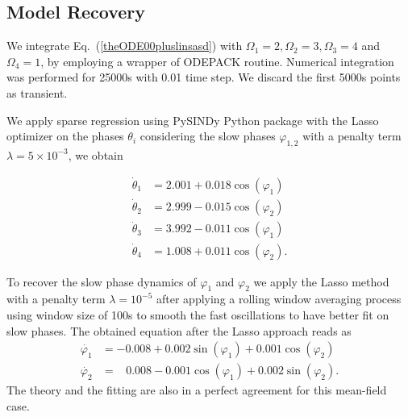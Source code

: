 \documentclass[12pt]{article}
\theoremstyle{plain}
\theoremstyle{definition}
\theoremstyle{remark}
\theoremstyle{remark}
\begin{document}
{\subsection{Model Recovery}
We integrate Eq.~(\ref{theODE00pluslinsasd}) with  $\Omega_1 = 2, \Omega_2 = 3, \Omega_3 = 4$ and $\Omega_4 = 1$, by employing a wrapper of ODEPACK routine. Numerical integration was performed for 25000s with 0.01 time step. We discard the first 5000s points as transient. 


We apply sparse regression using PySINDy Python package \cite{kaptanoglu2022} with the Lasso optimizer on the phases $\theta_i$ considering the slow phases $\varphi_{1,2}$ with a penalty term $\lambda = 5\times10^{-3}$, we obtain

\begin{align}
\dot{\theta}_1 &=2.001 + 0.018 \cos(\varphi_1) \\
\dot{\theta}_2 &=2.999 - 0.015 \cos(\varphi_2) \\
\dot{\theta}_3 &=3.992 - 0.011 \cos(\varphi_1) \\
\dot{\theta}_4 &=1.008 + 0.011 \cos(\varphi_2). 
\end{align}



To recover the slow phase dynamics of $\varphi_1$ and $\varphi_2$  we apply the Lasso method  with a penalty term $\lambda = 10^{-5}$ after applying a rolling window averaging process using window size of 100s to smooth the fast oscillations to have better fit on slow phases. The obtained equation after the Lasso approach reads as
\begin{align}\label{eq:3nodes_recon}
\dot{\varphi_1} &= -0.008 + 0.002 \sin(\varphi_1) + 0.001 \cos(\varphi_2) \\ 
\dot{\varphi_2} &= \,\,\,\,\, 0.008 - 0.001 \cos(\varphi_1) + 0.002 \sin(\varphi_2). 
\end{align}
The theory and the fitting are also in a perfect agreement for this mean-field case.

}
\end{document}
